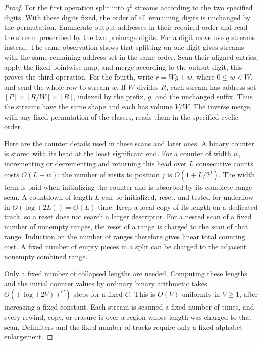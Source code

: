 \documentclass[11pt]{article}
\theoremstyle{definition}
\begin{document}
\begin{proof}
For the first operation split into $q^2$ streams according to the two
specified digits.  With these digits fixed, the order of all remaining
digits is unchanged by the permutation.  Enumerate output addresses in
their required order and read the stream prescribed by the two preimage
digits.  For a digit move use $q$ streams instead.  The same observation
shows that splitting on one digit gives streams with the same remaining
address set in the same order.  Scan their aligned entries, apply the
fixed pointwise map, and merge according to the output digit; this proves
the third operation.  For the fourth, write $r=Wg+w$, where
$0\le w<W$, and send the whole row to stream $w$.  If $W$ divides $R$,
each stream has address set $[P]\times[R/W]\times[B]$, indexed by the
prefix, $g$, and the unchanged suffix.  Thus the streams have the same
shape and each has volume $V/W$.  The inverse merge, with any fixed
permutation of the classes, reads them in the specified cyclic order.

Here are the counter details used in these scans and later ones.  A
binary counter is stored with its head at the least significant end.
For a counter of width $w$, incrementing or decrementing and returning
this head over $L$ consecutive counts costs $O(L+w)$: the number of
visits to position $j$ is $O(1+L/2^j)$. The width term is paid when
initializing the counter and is absorbed by its complete range scan.  A countdown of
length $L$ can be initialized, reset, and tested for underflow in
$O(\log(2L))=O(L)$ time.  Keep a local copy of its length on a dedicated
track, so a reset does not search a larger descriptor.  For a nested scan
of a fixed number of nonempty ranges, the reset of a range is charged to
the scan of that range.  Induction on the number of ranges therefore gives
linear total counting cost.  A fixed number of empty pieces in a split
can be charged to the adjacent nonempty combined range.

Only a fixed number of collapsed lengths are needed.  Computing these
lengths and the initial counter values by ordinary binary arithmetic
takes $O((\log(2V))^C)$ steps for a fixed $C$.  This is $O(V)$ uniformly
in $V\ge1$, after increasing a fixed constant.  Each stream is scanned a
fixed number of times, and every rewind, copy, or erasure is over a
region whose length was charged to that scan.  Delimiters and the fixed
number of tracks require only a fixed alphabet enlargement.
\end{proof}
\end{document}
